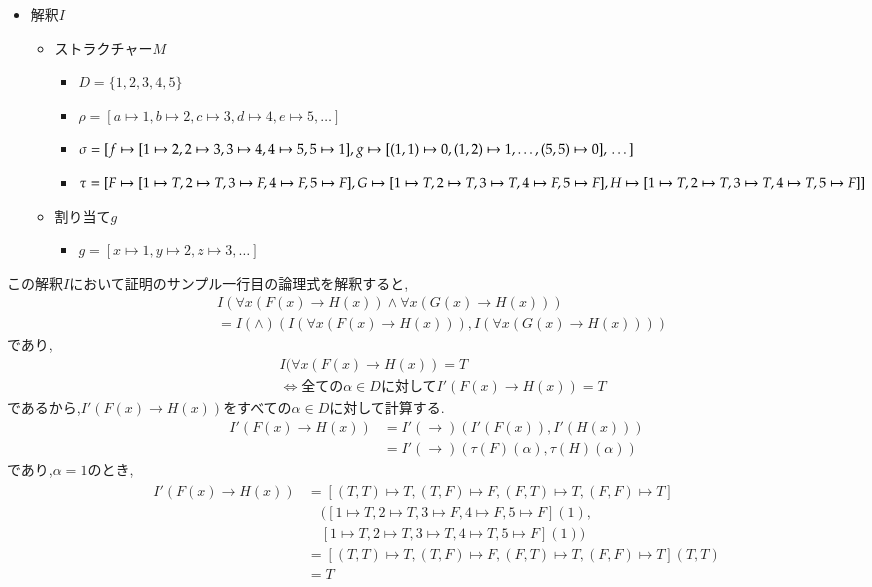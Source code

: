 \documentclass[10pt,b5paper,papersize,dvipdfmx]{jsbook}
\begin{document}
\begin{itemize}
\item 解釈$I$
\begin{itemize}
\item ストラクチャー$M$
\begin{itemize}
\item $D=\{1,2,3,4,5\}$
\item $\rho=[a\mapsto1,b\mapsto 2,c\mapsto 3,d\mapsto 4,e\mapsto 5,\dots]$
\item $\sigma=[\\
f\mapsto[1\mapsto 2,2\mapsto 3,3\mapsto 4,4\mapsto 5,5\mapsto 1],\\
g\mapsto[(1,1)\mapsto 0,(1,2)\mapsto 1,\dots,(5,5)\mapsto0],\\
\dots]$
\item $\tau=[\\
F\mapsto[1\mapsto T,2\mapsto T,3\mapsto F,4\mapsto F,5\mapsto F],\\
G\mapsto[1\mapsto T,2\mapsto T,3\mapsto T,4\mapsto F,5\mapsto F],\\
H\mapsto[1\mapsto T,2\mapsto T,3\mapsto T,4\mapsto T,5\mapsto F]\\]$
\end{itemize}
\item 割り当て$g$
\begin{itemize}
\item $g=[x\mapsto 1,y\mapsto 2,z\mapsto 3,\dots]$
\end{itemize}
\end{itemize}
\end{itemize}
この解釈$I$において証明のサンプル一行目の論理式を解釈すると,
\begin{align*}
&I(\forall x(F(x)\to H(x))\land \forall x(G(x)\to H(x)))\\
&=I(\land)(I(\forall x(F(x)\to H(x))),I(\forall x(G(x)\to H(x))))
\end{align*}
であり,
\begin{align*}
&I(\forall x(F(x)\to H(x))=T\\
&\Leftrightarrow \mbox{全ての}\alpha \in D\mbox{に対して}I'(F(x)\to H(x))=T
\end{align*}
であるから,$I'(F(x)\to H(x))$をすべての$\alpha \in D$に対して計算する.
\begin{align*}
I'(F(x)\to H(x))&=I'(\to)(I'(F(x)),I'(H(x)))\\
&=I'(\to)(\tau(F)(\alpha),\tau(H)(\alpha))
\end{align*}
であり,$\alpha=1$のとき,
\begin{align*}
\begin{split}
I'(F(x)\to H(x))&=[(T,T)\mapsto T,(T,F)\mapsto F,(F,T)\mapsto T,(F,F)\mapsto T]\\
&\quad([1\mapsto T,2\mapsto T,3\mapsto F,4\mapsto F,5\mapsto F](1),\\
&\quad[1\mapsto T,2\mapsto T,3\mapsto T,4\mapsto T,5\mapsto F](1))\\
&=[(T,T)\mapsto T,(T,F)\mapsto F,(F,T)\mapsto T,(F,F)\mapsto T](T,T)\\
&=T
\end{split}
\end{align*}
\end{document}

